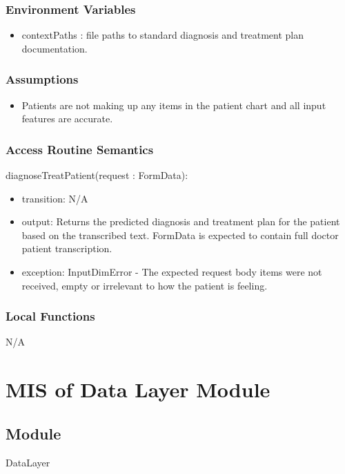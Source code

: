 \documentclass[12pt, titlepage]{article}
\begin{document}
\subsubsection{Environment Variables}
\begin{itemize}
  \item contextPaths : file paths to standard diagnosis and treatment plan documentation.
\end{itemize}

\subsubsection{Assumptions}

\begin{itemize}
  \item Patients are not making up any items in the patient chart and all input features are accurate.

\end{itemize}

\subsubsection{Access Routine Semantics}

\noindent diagnoseTreatPatient(request : FormData):
\begin{itemize}
\item transition: N/A
\item output: Returns the predicted diagnosis and treatment plan for the patient based on the transcribed text. FormData is expected to contain full doctor patient transcription.
\item exception: InputDimError - The expected request body items were not received, empty or irrelevant to how the patient is feeling.
\end{itemize}


\subsubsection{Local Functions}
N/A


\newpage

\section{MIS of Data Layer Module} \label{Module_DataLayer}

\subsection{Module}
DataLayer
\end{document}
